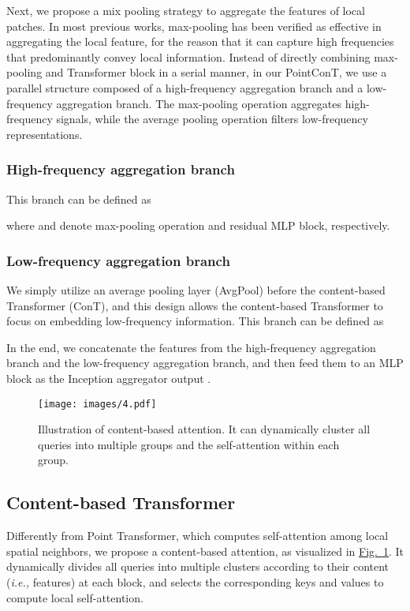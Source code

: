 \documentclass[lettersize,journal]{IEEEtran}
\begin{document}
Next, we propose a mix pooling strategy to aggregate the features of local patches.
In most previous works, max-pooling has been verified as effective in aggregating the local feature, 
for the reason that it can capture high frequencies that predominantly convey local information. 
Instead of directly combining max-pooling and Transformer block in a serial manner, in our PointConT, 
we use a parallel structure composed of a high-frequency aggregation branch and a low-frequency aggregation branch.
The max-pooling operation aggregates high-frequency signals, while the average pooling 
operation filters low-frequency representations. 


\subsubsection*{\bf High-frequency aggregation branch} 
This branch can be defined as

where  and  denote max-pooling operation and residual MLP block, respectively.

\subsubsection*{\bf Low-frequency aggregation branch}
We  simply utilize an average pooling layer (AvgPool) before the content-based Transformer (ConT),
and this design allows the content-based Transformer to focus on embedding low-frequency information. 
This branch can be defined as


In the end, we concatenate the features from the high-frequency aggregation branch and the low-frequency aggregation branch, 
and then feed them to an MLP block as the Inception aggregator output  .


\begin{figure}
  \centering
  \texttt{[image: images/4.pdf]}
  \caption{Illustration of content-based attention. It can dynamically cluster all queries into multiple groups and  the self-attention within each group.}
  \label{fig:attention}
\end{figure}

\subsection{Content-based Transformer}
Differently from Point Transformer\cite{pointtransformer}, which computes self-attention among 
local spatial neighbors, we propose a content-based attention, as visualized in \hyperref[fig:attention]{Fig.~\ref*{fig:attention}}. 
It dynamically divides all queries into multiple clusters according to their content
(\textit{i.e.,} features) at each block, and selects the corresponding keys and values to compute local self-attention. 
\end{document}
